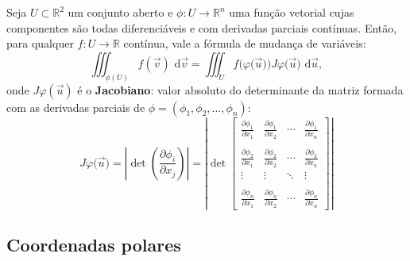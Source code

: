 \begin{teo}
Seja $U \subset \mathbb{R}^2$ um conjunto aberto e $\phi: U \to \mathbb{R}^n$ uma função vetorial cujas componentes são todas diferenciáveis e com derivadas parciais contínuas. Então, para qualquer $f: U \to \mathbb{R}$ contínua, vale a fórmula de mudança de variáveis:
\begin{equation}
\iiint_{\phi (U)}  f(\vec{v}) \, \, \mathrm{d} \vec{v} =  \iiint _{U} f\big(\varphi \big(\vec{u}\big)\big) J\varphi \big(\vec{u}\big) \, \, \mathrm{d}\vec{u},
\end{equation} onde $J\varphi (\vec{u})$ é o \textbf{Jacobiano}: valor absoluto do determinante da matriz formada com as derivadas parciais de $\phi = (\phi_1, \phi_2, \dots, \phi_n)$:
\begin{equation}
J\varphi \big(\vec{u}\big) = \left|
\det \left( \frac{\partial \phi_i}{\partial x_j} \right)
\right| = \left|
\det
\begin{bmatrix}
\frac{\partial \phi_1}{\partial x_1} & \frac{\partial \phi_1}{\partial x_2} & \cdots & \frac{\partial \phi_1}{\partial x_n} \\
 &&& \\
\frac{\partial \phi_2}{\partial x_1} & \frac{\partial \phi_2}{\partial x_2} & \cdots & \frac{\partial \phi_2}{\partial x_n} \\
\vdots & \vdots & \ddots & \vdots \\
 &&& \\
\frac{\partial \phi_n}{\partial x_1} & \frac{\partial \phi_n}{\partial x_2} & \cdots & \frac{\partial \phi_n}{\partial x_n}
\end{bmatrix}
\right|
\end{equation}
\end{teo}


\subsection{Coordenadas polares}

